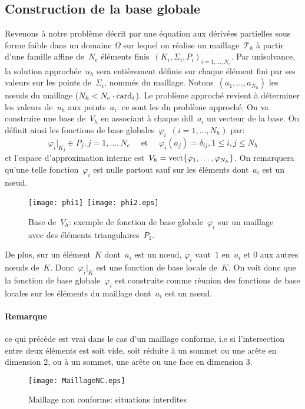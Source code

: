 \medskip
\subsection{Construction de la base globale}
Revenons à notre problème décrit par une équation aux dérivées partielles sous forme faible dans un domaine
$\Omega$ sur lequel on réalise un maillage~$\mathcal{T}_h$ à partir d'une famille affine
de~$N_e$ éléments finis~$(K_i, \Sigma_i, P_i)_{i=1,\ldots,N_e}$.
\medskip
Par unisolvance, la solution approchée~$u_h$ sera entièrement définie sur chaque élément fini
par ses valeurs sur les points de~$\Sigma_i$, nommés  du maillage.
Notons~$(a_1,\ldots, a_{N_h})$ les nœuds du maillage ($N_h<N_e \cdot \mathrm{card}_i$).
Le problème approché revient à déterminer les valeurs de~$u_h$ aux points~$a_i$:
ce sont les  du problème approché.
\medskip
On va construire une base de~$V_h$ en associant à chaque ddl~$a_i$ un vecteur de la base.
On définit ainsi les fonctions de base globales~$\varphi_i$~$(i = 1,\ldots, N_h)$ par:
\begin{equation}\varphi_i|_{K_j} \in P_j, j = 1,\ldots, N_e \quad \text{ et }\quad \varphi_i(a_j) = \delta_{ij}, 1\le i,j\le N_h\end{equation}
et l'espace d'approximation interne est~$V_h=\operatorname{vect}\{\varphi_1,\ldots, \varphi_{N_h}\}$.
On remarquera qu'une telle fonction~$\varphi_i$ est nulle partout sauf sur les éléments
dont~$a_i$ est un nœud.
\begin{figure}[ht]
\centering
\texttt{[image: phi1]}~\texttt{[image: phi2.eps]}
\caption{\label{BaseVh} Base de~$V_h$: exemple de fonction de base globale~$\varphi_i$ sur un maillage avec des éléments triangulaires~$P_1$.}
\end{figure}

\medskip
De plus, sur un élément~$K$ dont~$a_i$ est un nœud, $\varphi_i$ vaut~$1$ en~$a_i$ et
$0$ aux autres nœuds de~$K$. Donc~$\varphi_i|_K$ est une fonction de base locale de~$K$.
On voit donc que la fonction de base globale~$\varphi_i$ est construite comme réunion des
fonctions de base locales sur les éléments du maillage dont~$a_i$ est un nœud.

\medskip
\paragraph{Remarque} ce qui précède est vrai dans le cas d'un maillage conforme, i.e si
l'intersection entre deux éléments est soit vide, soit réduite à un
sommet ou une arête en dimension 2, ou à un sommet, une arête ou une face
en dimension 3.
\begin{figure}[ht]
\centering
\texttt{[image: MaillageNC.eps]}
\caption{Maillage non conforme: situations interdites}\label{maillageNC}
\end{figure}

